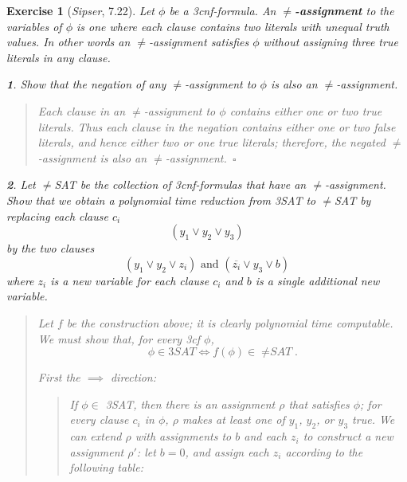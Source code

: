 \documentclass{article}
\theoremstyle{break}			%
\newtheorem{exercise}{Exercise}
\theoremstyle{plain}
\newtheorem{subexercise}{}[exercise]
\newenvironment{answer}{\begin{quotation}\noindent}{\end{quotation}}
\newcommand{\sipser}{\textit{Sipser}}
\renewcommand{\qed}{~\ensuremath{\square}}
\newcommand{\defin}[1]{\textbf{\textit{#1}}}
\newcommand{\setname}[1]{\textit{#1}}
\begin{document}
\begin{exercise}[\sipser, 7.22]\label{neq}
Let $\phi$ be a 3cnf-formula.  An \defin{$\not=$-assignment} to the
variables of $\phi$ is one where each clause contains two literals
with unequal truth values.  In other words an $\not=$-assignment
satisfies $\phi$ without assigning three true literals in any clause.
\begin{subexercise}
Show that the negation of any $\not=$-assignment to $\phi$ is also an
$\not=$-assignment.
\end{subexercise}
\begin{answer}
Each clause in an $\not=$-assignment to $\phi$ contains either one or
two true literals.  Thus each clause in the negation contains
either one or two false literals, and hence either two or one true
literals; therefore, the negated $\not=$-assignment is also an
$\not=$-assignment.\qed
\end{answer}

\begin{subexercise}
Let $\not=$\setname{SAT} be the collection of 3cnf-formulas that have
an $\not=$-assignment.  Show that we obtain a polynomial time
reduction from \setname{3SAT} to $\not=$\setname{SAT} by replacing
each clause $c_i$
\begin{displaymath}
(y_1\vee y_2\vee y_3)
\end{displaymath}
by the two clauses
\begin{displaymath}
(y_1\vee y_2\vee z_i)\text{ and }(\overline{z_i}\vee y_3\vee b)
\end{displaymath}
where $z_i$ is a new variable for each clause $c_i$ and $b$ is a
single additional new variable.
\end{subexercise}
\begin{answer}
Let $f$ be the construction above; it is clearly polynomial time
computable.  We must show that, for every 3cf $\phi$,
\begin{displaymath}
\phi\in\setname{3SAT} \iff f(\phi)\in\setname{$\not=$SAT}.
\end{displaymath}

\pagebreak
\noindent First the $\implies$ direction:
\begin{quotation}
If $\phi\in$ \setname{3SAT}, then there is an assignment $\rho$ that
satisfies $\phi$; for every clause $c_i$ in $\phi$, $\rho$ makes at
least one of $y_1$, $y_2$, or $y_3$ true.  We can extend $\rho$ with
assignments to $b$ and each $z_i$ to construct a new assignment
$\rho'$: let $b=0$, and assign each $z_i$ according to the following
table:


\end{quotation}
\end{answer}
\end{exercise}
\end{document}

